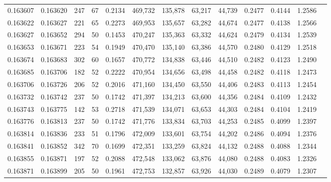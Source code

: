 \begin{tabular}{rrrrrrrrrrrrr}
0.163607 & 0.163620 &   247 &  67 &                                     0.2134 & 469,732 & 135,878 &  63,217 &  44,739 & 0.2477 & 0.4144 & 1.2586 \\
0.163622 & 0.163627 &   221 &  65 &                                     0.2273 & 469,953 & 135,657 &  63,282 &  44,674 & 0.2477 & 0.4138 & 1.2566 \\
0.163627 & 0.163652 &   294 &  50 &                                     0.1453 & 470,247 & 135,363 &  63,332 &  44,624 & 0.2479 & 0.4134 & 1.2539 \\
0.163653 & 0.163671 &   223 &  54 &                                     0.1949 & 470,470 & 135,140 &  63,386 &  44,570 & 0.2480 & 0.4129 & 1.2518 \\
0.163674 & 0.163683 &   302 &  60 &                                     0.1657 & 470,772 & 134,838 &  63,446 &  44,510 & 0.2482 & 0.4123 & 1.2490 \\
0.163685 & 0.163706 &   182 &  52 &                                     0.2222 & 470,954 & 134,656 &  63,498 &  44,458 & 0.2482 & 0.4118 & 1.2473 \\
0.163706 & 0.163726 &   206 &  52 &                                     0.2016 & 471,160 & 134,450 &  63,550 &  44,406 & 0.2483 & 0.4113 & 1.2454 \\
0.163732 & 0.163742 &   237 &  50 &                                     0.1742 & 471,397 & 134,213 &  63,600 &  44,356 & 0.2484 & 0.4109 & 1.2432 \\
0.163743 & 0.163775 &   142 &  53 &                                     0.2718 & 471,539 & 134,071 &  63,653 &  44,303 & 0.2484 & 0.4104 & 1.2419 \\
0.163776 & 0.163813 &   237 &  50 &                                     0.1742 & 471,776 & 133,834 &  63,703 &  44,253 & 0.2485 & 0.4099 & 1.2397 \\
0.163814 & 0.163836 &   233 &  51 &                                     0.1796 & 472,009 & 133,601 &  63,754 &  44,202 & 0.2486 & 0.4094 & 1.2376 \\
0.163841 & 0.163852 &   342 &  70 &                                     0.1699 & 472,351 & 133,259 &  63,824 &  44,132 & 0.2488 & 0.4088 & 1.2344 \\
0.163855 & 0.163871 &   197 &  52 &                                     0.2088 & 472,548 & 133,062 &  63,876 &  44,080 & 0.2488 & 0.4083 & 1.2326 \\
0.163871 & 0.163899 &   205 &  50 &                                     0.1961 & 472,753 & 132,857 &  63,926 &  44,030 & 0.2489 & 0.4079 & 1.2307 \\

\end{tabular}
